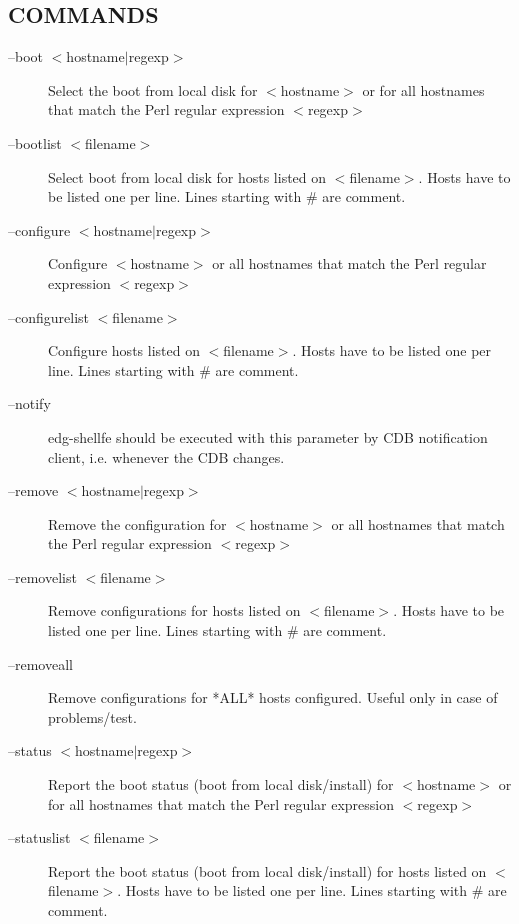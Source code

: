 \subsection*{COMMANDS\label{edg-shellfe_COMMANDS}}
\begin{description}

\item[--boot $<$hostname$|$regexp$>$] \mbox{}

Select the boot from local disk for $<$hostname$>$ or for all hostnames
that match the Perl regular expression $<$regexp$>$


\item[--bootlist $<$filename$>$] \mbox{}

Select boot from local disk for hosts listed on $<$filename$>$. Hosts have to
be listed one per line. Lines starting with \# are comment.


\item[--configure $<$hostname$|$regexp$>$] \mbox{}

Configure $<$hostname$>$ or all hostnames that match the Perl regular
expression $<$regexp$>$


\item[--configurelist $<$filename$>$] \mbox{}

Configure hosts listed on $<$filename$>$. Hosts have to
be listed one per line. Lines starting with \# are comment.


\item[--notify] \mbox{}

edg-shellfe should be executed with this parameter by CDB notification
client, i.e. whenever the CDB changes.


\item[--remove $<$hostname$|$regexp$>$] \mbox{}

Remove the configuration for $<$hostname$>$ or all hostnames that match the Perl regular
expression $<$regexp$>$


\item[--removelist $<$filename$>$] \mbox{}

Remove configurations for hosts listed on $<$filename$>$. Hosts have to
be listed one per line. Lines starting with \# are comment.


\item[--removeall] \mbox{}

Remove configurations for *ALL* hosts configured. Useful only in case
of problems/test.


\item[--status $<$hostname$|$regexp$>$] \mbox{}

Report the boot status (boot from local disk/install) for $<$hostname$>$ or
for all hostnames that match the Perl regular expression $<$regexp$>$


\item[--statuslist $<$filename$>$] \mbox{}

Report the boot status (boot from local disk/install) for hosts listed
on $<$filename$>$. Hosts have to be listed one per line. Lines starting
with \# are comment.

\end{description}
